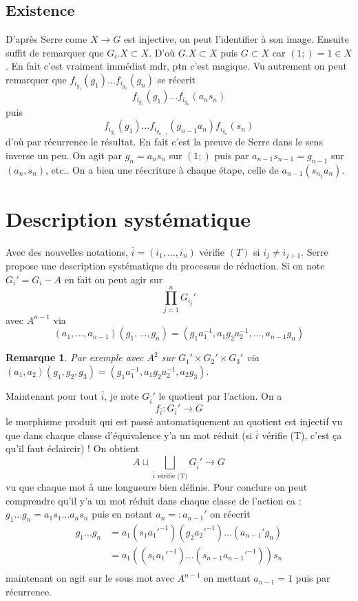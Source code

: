 \documentclass[a4paper,12pt]{book}
\theoremstyle{plain}
\newtheorem{rem}{Remarque}
\theoremstyle{definition}
\theoremstyle{remark}
\begin{document}
\subsection{Existence}
D'après Serre come $X\to G$ est injective, on peut l'identifier
à son image. Ensuite suffit de remarquer que $G_i.X\subset X$.
D'où $G.X\subset X$ puis $G\subset X$ car $(1;)=1\in X$.
En fait c'est vraiment immédiat mdr, ptn c'est magique. Vu
autrement on peut remarquer que 
$f_{i_{g_1}}(g_1)\ldots f_{i_{g_n}}(g_n)$ se réecrit
\[f_{i_{g_1}}(g_1)\ldots f_{i_{g_n}}(a_ns_n)\] puis 
\[f_{i_{g_1}}(g_1)\ldots f_{i_{g_{n-1}}}(g_{n-1}a_n) f_{i_{g_n}}(s_n)\]
d'où par récurrence le résultat. En fait c'est la preuve de 
Serre dans le sens inverse un peu. On agit par $g_n=a_ns_n$ sur
$(1;)$ puis par $a_{n-1}s_{n-1}=g_{n-1}$ sur $(a_n,s_n)$, etc.. On
a bien une réecriture à chaque étape, celle de 
$a_{n-1}(s_{n_1}a_n)$.

\section{Description systématique}
Avec des nouvelles notations, $\bar i=(i_1,\ldots,i_n)$ vérifie
$(T)$ si $i_j\ne i_{j+1}$.
Serre propose une description systématique du processus de 
réduction. Si on note $G_i'=G_i-A$ en fait on peut agir sur
\[\prod_{j=1}^n G_{i_j}'\]
avec $A^{n-1}$ via 
\[(a_1,\ldots,a_{n-1})(g_1,\ldots, g_n)=(g_1a_1^{-1},a_1g_2a_2^{-1},\ldots,a_{n-1}g_n)\]
\begin{rem}
Par exemple avec $A^2$ sur $G_1'\times G_2'\times G_3'$ via
$(a_1,a_2)(g_1,g_2,g_3)=(g_1a_1^{-1},a_1g_2a_2^{-1},a_2g_3)$.
\end{rem}
Maintenant pour tout $\bar i$, je note $G_{\bar i}'$ le quotient
par l'action. On a 
\[f_{\bar i}\colon G_{\bar i}'\to G\]
le morphisme produit qui est passé automatiquement au quotient
est injectif vu que dans chaque classe d'équivalence y'a un mot
réduit (si $\bar i$ vérifie (T), c'est ça qu'il faut éclaircir) !
On obtient \[A\sqcup \bigsqcup_{\bar i\textrm{ vérifie (T)}} G_{\bar i}'\to G\]
vu que chaque mot à une longueure bien définie. Pour conclure
on peut comprendre qu'il y'a un mot réduit dans chaque classe
de l'action ca : $g_1\ldots g_n=a_1s_1\ldots a_ns_n$ puis
en notant $a_n=:a_{n-1}'$ 
on réecrit 
\begin{align*}
g_1\ldots g_n&=a_1(s_1a_1'^{-1})(g_2a_2'^{-1})\ldots (a_{n-1}'g_n)\\
	     &=a_1((s_1a_1'^{-1})\ldots (s_{n-1}a_{n-1}'^{-1}))s_n\\
\end{align*}
maintenant on agit sur le sous mot avec $A^{n-1}$ en mettant
$a_{n-1}=1$ puis par récurrence.
\end{document}
